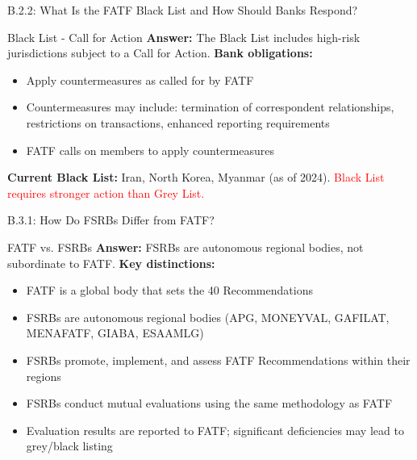 \documentclass{beamer}
\begin{document}
	\begin{frame}{B.2.2: What Is the FATF Black List and How Should Banks Respond?}
		\begin{block}{Black List - Call for Action}
			\textbf{Answer:} The Black List includes high-risk jurisdictions subject to a Call for Action.
			\vspace{0.2cm}
			\textbf{Bank obligations:}
			\begin{itemize}
				\item Apply countermeasures as called for by FATF
				\item Countermeasures may include: termination of correspondent relationships, restrictions on transactions, enhanced reporting requirements
				\item FATF calls on members to apply countermeasures
			\end{itemize}
			\textbf{Current Black List:} Iran, North Korea, Myanmar (as of 2024).
			\textcolor{red}{Black List requires stronger action than Grey List.}
		\end{block}
	\end{frame}
	
	
	\begin{frame}{B.3.1: How Do FSRBs Differ from FATF?}
		\begin{block}{FATF vs. FSRBs}
			\textbf{Answer:} FSRBs are autonomous regional bodies, not subordinate to FATF.
			\vspace{0.2cm}
			\textbf{Key distinctions:}
			\begin{itemize}
				\item FATF is a global body that sets the 40 Recommendations
				\item FSRBs are autonomous regional bodies (APG, MONEYVAL, GAFILAT, MENAFATF, GIABA, ESAAMLG)
				\item FSRBs promote, implement, and assess FATF Recommendations within their regions
				\item FSRBs conduct mutual evaluations using the same methodology as FATF
				\item Evaluation results are reported to FATF; significant deficiencies may lead to grey/black listing
			\end{itemize}
		\end{block}
	\end{frame}
	
\end{document}

